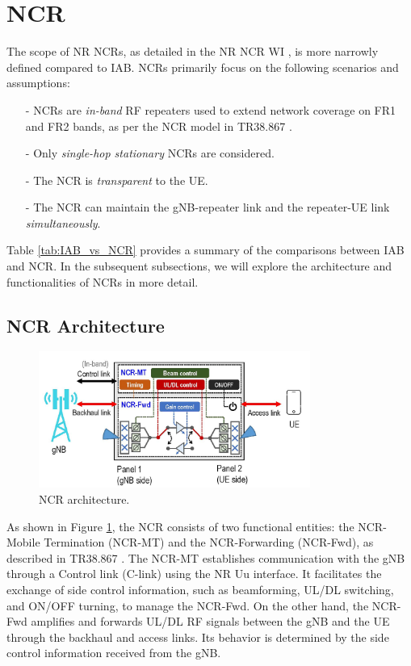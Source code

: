\documentclass[lettersize,journal]{IEEEtran}
\begin{document}
\section{NCR}

The scope of NR NCRs, as detailed in the NR NCR WI \cite{RP-222673}, is more narrowly defined compared to IAB. NCRs primarily focus on the following scenarios and assumptions:
\begin{itemize}
\item[-] NCRs are \emph{in-band} RF repeaters used to extend network coverage on FR1 and FR2 bands, as per the NCR model in TR38.867 \cite{3GPP-38-867}.
\item[-] Only \emph{single-hop stationary} NCRs are considered.
\item[-] The NCR is \emph{transparent} to the UE.
\item[-] The NCR can maintain the gNB-repeater link and the repeater-UE link \emph{simultaneously}.
\end{itemize}
Table \ref{tab:IAB_vs_NCR} provides a summary of the comparisons between IAB and NCR. In the subsequent subsections, we will explore the architecture and functionalities of NCRs in more detail.

\subsection{NCR Architecture}

\begin{figure}
\centering
\includegraphics[width=3.5in]{Figs/NCR.jpg}
\caption{NCR architecture.}
\label{fig:NCR}
\end{figure}


As shown in Figure \ref{fig:NCR}, the NCR consists of two functional entities: the NCR-Mobile Termination (NCR-MT) and the NCR-Forwarding (NCR-Fwd), as described in TR38.867 \cite{3GPP-38-867}. The NCR-MT establishes communication with the gNB through a Control link (C-link) using the NR Uu interface. It facilitates the exchange of side control information, such as beamforming, UL/DL switching, and ON/OFF turning, to manage the NCR-Fwd. On the other hand, the NCR-Fwd amplifies and forwards UL/DL RF signals between the gNB and the UE through the backhaul and access links. Its behavior is determined by the side control information received from the gNB.
\end{document}
